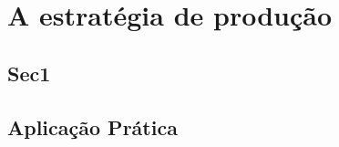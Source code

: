 \chapter{A estratégia de produção} 
\label{chap:estrategia_da_producao} 

\section{Sec1} 
\label{sec:estrategia_da_producao_desempenho} 


\section{Aplicação Prática} 
\label{sec:estrategia_da_producao_aplicacao}